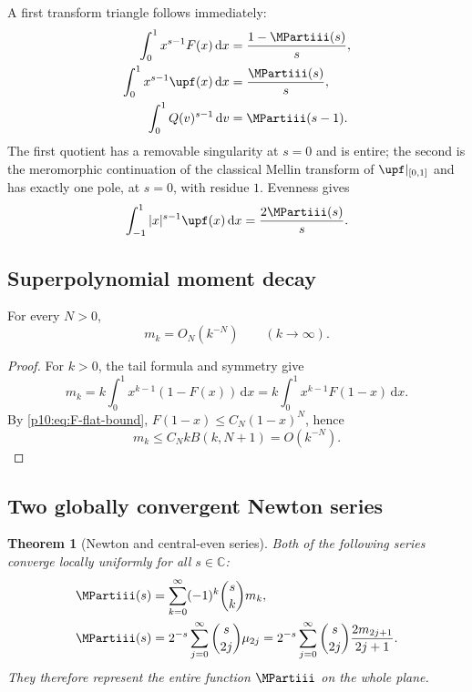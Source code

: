 \documentclass[11pt,oneside]{article}
\newtheorem{theorem}{Theorem}[section]
\theoremstyle{definition}
\theoremstyle{remark}
\newcommand{\F}{F}
\newcommand{\Q}{Q}
\newcommand{\C}{\mathbb C}
\newcommand{\dd}{\,\mathrm d}
\newcommand{\1}{\mathbf 1}
\begin{document}
A first transform triangle follows immediately:
\begin{align}
 \int_0^1x^{s-1}\F(x)\dd x&=\frac{1-\MPartiii(s)}s,
 \label{p10:eq:Mellin-F}\\
 \int_0^1x^{s-1}\upf(x)\dd x&=\frac{\MPartiii(s)}s,
 \label{p10:eq:Mellin-up-half}\\
 \int_0^1\Q(v)^{s-1}\dd v&=\MPartiii(s-1).
 \label{p10:eq:Mellin-Q}
\end{align}
The first quotient has a removable singularity at \(s=0\) and is entire; the second
is the meromorphic continuation of the classical Mellin transform of \(\upf|_{[0,1]}\)
and has exactly one pole, at \(s=0\), with residue \(1\).  Evenness gives
\begin{equation}\label{p10:eq:absolute-Mellin-up}
 \int_{-1}^1|x|^{s-1}\upf(x)\dd x=\frac{2\MPartiii(s)}s.
\end{equation}

\subsection{Superpolynomial moment decay}

\begin{lemma}\label{p10:lem:moment-decay}
For every \(N>0\),
\begin{equation}\label{p10:eq:moment-decay}
 m_k=O_N(k^{-N})\qquad(k\to\infty).
\end{equation}
\end{lemma}

\begin{proof}
For \(k>0\), the tail formula and symmetry give
\[
 m_k=k\int_0^1x^{k-1}(1-\F(x))\dd x
 =k\int_0^1x^{k-1}\F(1-x)\dd x.
\]
By \cref{p10:eq:F-flat-bound}, \(\F(1-x)\le C_N(1-x)^N\), hence
\[
 m_k\le C_N kB(k,N+1)=O(k^{-N}).
\]
\end{proof}

\subsection{Two globally convergent Newton series}

\begin{theorem}[Newton and central-even series]\label{p10:thm:newton}
Both of the following series converge locally uniformly for all \(s\in\C\):
\begin{align}
 \MPartiii(s)&=\sum_{k=0}^{\infty}(-1)^k\binom{s}{k}m_k,
 \label{p10:eq:M-Newton}\\
 \MPartiii(s)&=2^{-s}\sum_{j=0}^{\infty}\binom{s}{2j}\mu_{2j}
 =2^{-s}\sum_{j=0}^{\infty}\binom{s}{2j}\frac{2m_{2j+1}}{2j+1}.
 \label{p10:eq:M-central}
\end{align}
They therefore represent the entire function \(\MPartiii\) on the whole plane.
\end{theorem}
\end{document}
